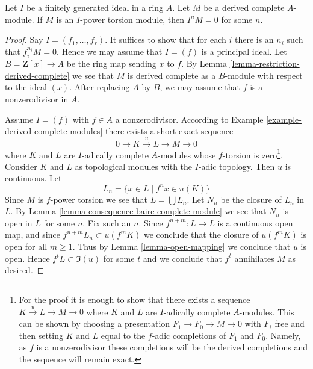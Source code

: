 \begin{lemma}[Bhatt]
\label{lemma-torsion-and-derived-complete}
Let $I$ be a finitely generated ideal in a ring $A$.
Let $M$ be a derived complete $A$-module. If $M$ is
an $I$-power torsion module, then $I^nM = 0$ for some $n$.
\end{lemma}

\begin{proof}
Say $I = (f_1, \ldots, f_r)$. It suffices to show
that for each $i$ there is an $n_i$ such that $f_i^{n_i}M = 0$.
Hence we may assume that $I = (f)$ is a principal ideal.
Let $B = \mathbf{Z}[x] \to A$ be the ring map sending $x$ to $f$.
By Lemma \ref{lemma-restriction-derived-complete}
we see that $M$ is derived complete as a $B$-module
with respect to the ideal $(x)$. After replacing $A$ by
$B$, we may assume that $f$ is a nonzerodivisor in $A$.

\medskip\noindent
Assume $I = (f)$ with $f \in A$ a nonzerodivisor.
According to Example \ref{example-derived-complete-modules}
there exists a short exact sequence
$$
0 \to K \xrightarrow{u} L \to M \to 0
$$
where $K$ and $L$ are $I$-adically complete $A$-modules
whose $f$-torsion is zero\footnote{For the proof it is enough
to show that there exists a sequence $K \xrightarrow{u} L \to M \to 0$
where $K$ and $L$ are $I$-adically complete $A$-modules. This can
be shown by choosing a presentation $F_1 \to F_0 \to M \to 0$
with $F_i$ free and then setting $K$ and $L$ equal to the
$f$-adic completions of $F_1$ and $F_0$. Namely, as $f$
is a nonzerodivisor these completions will be the
derived completions and the sequence will remain exact.}.
Consider $K$ and $L$ as
topological modules with the $I$-adic topology. Then $u$ is continuous.
Let
$$
L_n = \{x \in L \mid f^n x \in u(K)\}
$$
Since $M$ is $f$-power torsion we see that
$L = \bigcup L_n$. Let $N_n$ be the closure of $L_n$ in $L$.
By Lemma \ref{lemma-consequence-baire-complete-module}
we see that $N_n$ is open in $L$ for some $n$. Fix such an $n$.
Since $f^{n + m} : L \to L$ is a continuous open map, and since
$f^{n + m} L_n \subset u(f^m K)$ we conclude that
the closure of $u(f^mK)$ is open for all $m \geq 1$.
Thus by Lemma \ref{lemma-open-mapping}
we conclude that $u$ is open. Hence $f^tL \subset \Im(u)$
for some $t$ and we conclude that $f^t$ annihilates $M$
as desired.
\end{proof}
